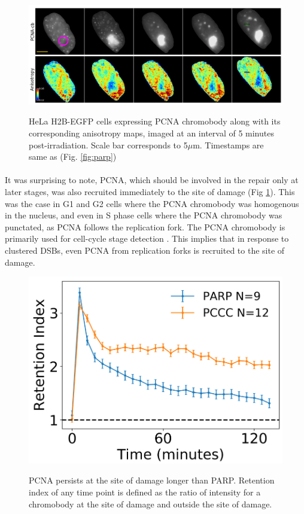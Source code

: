 \begin{figure}[H]
    {\hfill\includegraphics[clip, width=1\linewidth]{figures/pcna.png}\hspace*{\fill}}
    \caption{HeLa H2B-EGFP cells expressing PCNA chromobody along with its corresponding anisotropy maps, imaged at an  interval of 5 minutes post-irradiation. Scale bar corresponds to 5$\mu$m. Timestamps are same as (Fig. \ref{fig:parp})}
    {\label{fig:pcna}}
\end{figure}

\paragraph*{} It was surprising to note, PCNA, which should be involved in the repair only at later stages, was also recruited immediately to the site of damage (Fig \ref{fig:pcna}). This was the case in G1 and G2 cells where the PCNA chromobody was homogenous in the nucleus, and even in S phase cells where the PCNA chromobody was punctated, as PCNA follows the replication fork. The PCNA chromobody is primarily used for cell-cycle stage detection \cite{BURGESS20141703}. This implies that in response to clustered DSBs, even PCNA from replication forks is recruited to the site of damage. 


\begin{figure}[H]
    {\hfill\includegraphics[clip, width=0.5\linewidth]{figures/retention.png}\hspace*{\fill}}
    \caption{PCNA persists at the site of damage longer than PARP. Retention index of any time point is defined as the ratio of intensity for a chromobody at the site of damage and outside the site of damage.}
    {\label{fig:retention}}
\end{figure}

